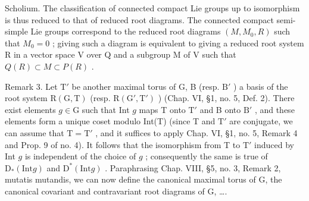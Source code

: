 Scholium. The classification of connected compact Lie groups up to isomorphism is thus reduced to that of reduced root diagrams. The connected compact semi-simple Lie groups correspond to the reduced root diagrams \((M, M_{0}, R)\) such that \(M_{0} = 0\) ; giving such a diagram is equivalent to giving a reduced root system R in a vector space V over Q and a subgroup M of V such that \(Q(R) \subset M \subset P(R)\) .

Remark 3. Let \(\mathrm{T}'\) be another maximal torus of G, B (resp. \(\mathrm{B}'\) ) a basis of the root system \(\mathrm{R}(\mathrm{G},\mathrm{T})\) (resp. \(\mathrm{R}(\mathrm{G}',\mathrm{T}')\) ) (Chap. VI, §1, no. 5, Def. 2). There exist elements \(g\in \mathrm{G}\) such that Int \(g\) maps T onto \(\mathrm{T}'\) and B onto \(\mathrm{B}'\) , and these elements form a unique coset modulo Int(T) (since T and \(\mathrm{T}'\) are conjugate, we can assume that \(\mathrm{T} = \mathrm{T}'\) , and it suffices to apply Chap. VI, §1, no. 5, Remark 4 and Prop. 9 of no. 4). It follows that the isomorphism from T to \(\mathrm{T}'\) induced by Int \(g\) is independent of the choice of \(g\) ; consequently the same is true of \(\mathrm{D}_{*}(\mathrm{Int}g)\) and \(\mathrm{D}^{*}(\mathrm{Int}g)\) . Paraphrasing Chap. VIII, §5, no. 3, Remark 2, mutatis mutandis, we can now define the canonical maximal torus of G, the canonical covariant and contravariant root diagrams of G, \ldots.

